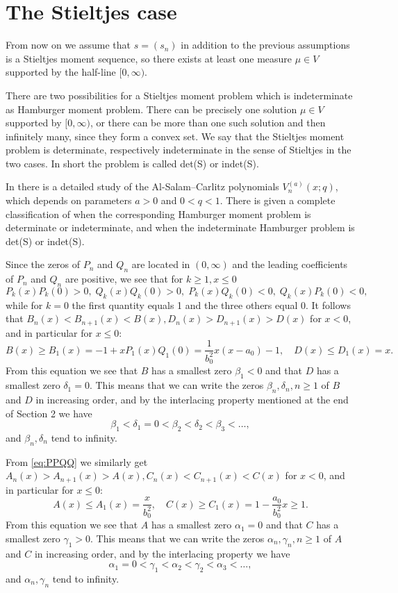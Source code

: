 \documentclass[12pt]{article}
\begin{document}
\section{The Stieltjes case}
From now on we assume that $s=(s_n)$ in addition to the previous assumptions is  a Stieltjes moment sequence, so there exists at least one measure $\mu\in V$ supported by the half-line $[0,\infty)$.

There are two possibilities for a Stieltjes moment problem which is indeterminate as Hamburger moment problem. There can be precisely one solution $\mu\in V$ supported by $[0,\infty)$, or there can be more than one such solution and then infinitely many, since they form a convex set. We say that the Stieltjes moment problem is determinate, respectively indeterminate in the sense of Stieltjes in the two cases. In short
the problem is called det(S) or indet(S).

In \cite[Section 4]{B:V} there is a detailed study of the Al-Salam--Carlitz polynomials $V_n^{(a)}(x;q)$, which depends on parameters $a>0$ and $0<q<1$. There is given a complete classification of when the corresponding Hamburger moment problem is determinate or indeterminate, and when the indeterminate Hamburger problem is det(S) or indet(S).  

Since the zeros of $P_n$ and $Q_n$ are located in $(0,\infty)$ and the leading coefficients of $P_n$ and $Q_n$ are positive, we see that for $k\ge 1, x\le 0$
\begin{equation}\label{eq:PPQQ}
P_k(x)P_k(0)>0,\;Q_k(x)Q_k(0)>0,\;P_k(x)Q_k(0)<0,\;Q_k(x)P_k(0)<0,
\end{equation}  
while for $k=0$ the first quantity equals 1 and the three others equal 0.
It follows that $B_n(x)<B_{n+1}(x)<B(x), D_n(x)>D_{n+1}(x)>D(x)$ for $x<0$, and in particular for $x\le 0$:
\begin{equation}\label{eq:zeroBD}
B(x)\ge B_1(x)=-1+xP_1(x)Q_1(0)=\frac{1}{b_0^2}x(x-a_0)-1,\quad D(x)\le D_1(x)=x.
\end{equation}
 From this equation we see that $B$ has a  smallest  zero $\beta_1<0$ and that $D$ has a smallest zero $\delta_1=0$. This means that we can write the zeros 
 $\beta_n,\delta_n, n\ge 1$ of $B$ and $D$ in increasing order, and by the interlacing property mentioned at the end of Section 2 we have
$$
\beta_1<\delta_1=0<\beta_2<\delta_2<\beta_3<\ldots,
$$
and $\beta_n,\delta_n$ tend to infinity.

From \eqref{eq:PPQQ} we similarly get $A_n(x)>A_{n+1}(x)>A(x), C_n(x)<C_{n+1}(x)<C(x)$ for $x<0$, and in particular for $x\le 0$:
\begin{equation}\label{eq:zeroAC}
A(x)\le A_1(x)=\frac{x}{b_0^2},\quad C(x)\ge C_1(x)=1-\frac{a_0}{b_0^2}x\ge 1.
\end{equation}
From this equation we see that $A$ has a  smallest  zero $\alpha_1=0$ and that $C$ has a smallest zero $\gamma_1>0$. This means that we can write the zeros 
 $\alpha_n,\gamma_n, n\ge 1$ of $A$ and $C$ in increasing order, and by the interlacing property we have
$$
\alpha_1=0<\gamma_1<\alpha_2<\gamma_2<\alpha_3<\ldots,
$$ 
 and $\alpha_n,\gamma_n$ tend to infinity.
 
\end{document}
